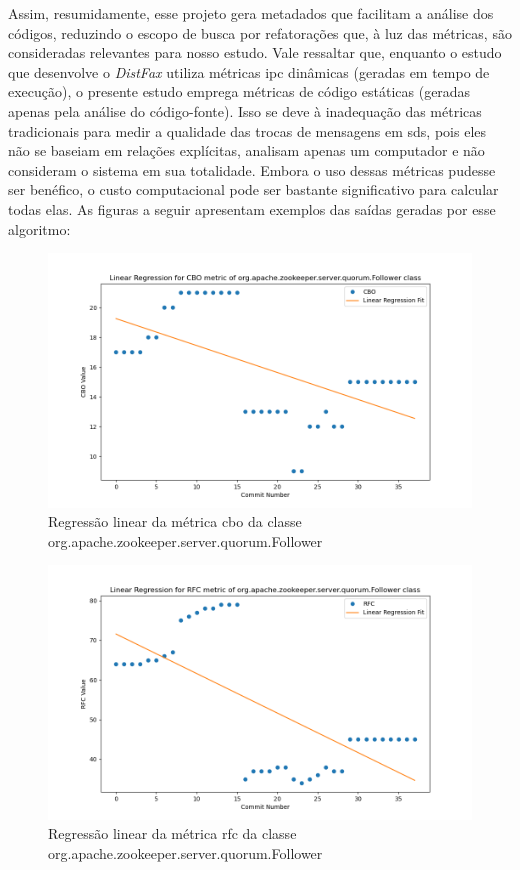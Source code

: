 Assim, resumidamente, esse projeto gera metadados que facilitam a análise dos códigos, reduzindo o escopo de busca por refatorações que, à luz das métricas, são consideradas relevantes para nosso estudo. Vale ressaltar que, enquanto o estudo que desenvolve o \textit{DistFax} \cite{DistFax} utiliza métricas \gls{ipc} dinâmicas (geradas em tempo de execução), o presente estudo emprega métricas de código estáticas (geradas apenas pela análise do código-fonte). Isso se deve à inadequação das métricas tradicionais para medir a qualidade das trocas de mensagens em \gls{sds}, pois eles não se baseiam em relações explícitas, analisam apenas um computador e não consideram o sistema em sua totalidade. Embora o uso dessas métricas pudesse ser benéfico, o custo computacional pode ser bastante significativo para calcular todas elas.
As figuras a seguir apresentam exemplos das saídas geradas por esse algoritmo:

\begin{figure}[h]
    \centering
    \includegraphics[width=0.8\linewidth]{figuras/Output/Metrics_Predictions/CBO.png}
    \caption{Regressão linear da métrica \gls{cbo} da classe org.apache.zookeeper.server.quorum.Follower}
    \label{fig:RlCBO}
\end{figure}

\begin{figure}[h]
    \centering
    \includegraphics[width=0.8\linewidth]{figuras/Output/Metrics_Predictions/RFC.png}
    \caption{Regressão linear da métrica \gls{rfc} da classe org.apache.zookeeper.server.quorum.Follower}
    \label{fig:RlRFC}
\end{figure}

